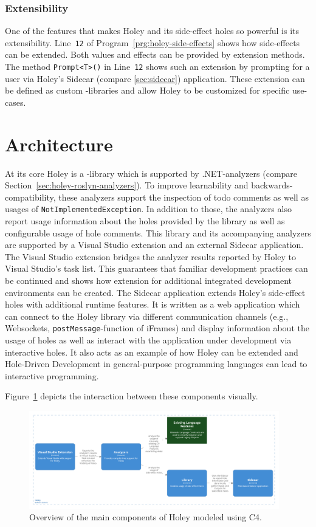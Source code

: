 \subsubsection{Extensibility}
One of the features that makes Holey and its side-effect holes so powerful is its extensibility.
Line~\verb|12| of Program~\ref{prg:holey-side-effects} shows how side-effects can be extended.
Both values and effects can be provided by extension methods.
The method \verb|Prompt<T>()| in Line~\verb|12| shows such an extension by prompting for a user via Holey's Sidecar (compare \ref{sec:sidecar}) application.
These extension can be defined as custom \CS-libraries and allow Holey to be customized for specific use-cases.


\section{Architecture}
\label{sec:holey-architecture}
At its core Holey is a \CS-library which is supported by .NET-analyzers (compare Section~\ref{sec:holey-roslyn-analyzers}).
To improve learnability and backwards-compatibility, these analyzers support the inspection of todo comments as well as usages of \verb|NotImplementedException|.
In addition to those, the analyzers also report usage information about the holes provided by the library as well as configurable usage of hole comments.
This library and its accompanying analyzers are supported by a Visual Studio extension and an external Sidecar application.
The Visual Studio extension bridges the analyzer results reported by Holey to Visual Studio's task list.
This guarantees that familiar development practices can be continued and shows how extension for additional integrated development environments can be created.
The Sidecar application extends Holey's side-effect holes with additional runtime features.
It is written as a web application which can connect to the Holey library via different communication channels (e.g., Websockets, \verb|postMessage|-function of iFrames) and display information about the usage of holes as well as interact with the application under development via interactive holes.
It also acts as an example of how Holey can be extended and Hole-Driven Development in general-purpose programming languages can lead to interactive programming.

Figure~\ref{fig:holey-architecture} depicts the interaction between these components visually.
\begin{figure}[ht]
    \centering
    \includegraphics[width=0.97\textwidth]{images/holey-architecture}
    \caption{Overview of the main components of Holey modeled using C4.}
    \label{fig:holey-architecture}
\end{figure}

